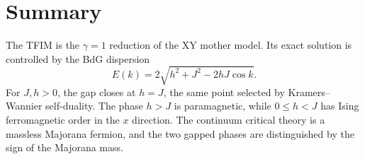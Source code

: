 \section{Summary}
\label{sec:tfim-summary}

The TFIM is the $\gamma=1$ reduction of the XY mother model.  Its exact solution
is controlled by the BdG dispersion
\begin{equation}
    E(k)=2\sqrt{h^2+J^2-2hJ\cos k}.
\end{equation}
For $J,h>0$, the gap closes at $h=J$, the same point selected by
Kramers--Wannier self-duality.  The phase $h>J$ is paramagnetic, while
$0\leq h<J$ has Ising ferromagnetic order in the $x$ direction.  The continuum
critical theory is a massless Majorana fermion, and the two gapped phases are
distinguished by the sign of the Majorana mass.
